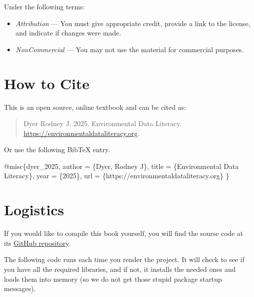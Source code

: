 \documentclass[
  letterpaper,
]{book}
\newenvironment{Shaded}{\begin{snugshade}}{\end{snugshade}}
\newcommand{\DataTypeTok}[1]{\textcolor[rgb]{0.68,0.00,0.00}{#1}}
\newcommand{\NormalTok}[1]{\textcolor[rgb]{0.00,0.23,0.31}{#1}}
\newcommand{\OtherTok}[1]{\textcolor[rgb]{0.00,0.23,0.31}{#1}}
\newcommand{\VariableTok}[1]{\textcolor[rgb]{0.07,0.07,0.07}{#1}}
\providecommand{\tightlist}{%
  \setlength{\itemsep}{0pt}\setlength{\parskip}{0pt}}
\begin{document}
Under the following terms:

\begin{itemize}
\tightlist
\item
  \emph{Attribution} --- You must give appropriate credit, provide a
  link to the license, and indicate if changes were made.\\
\item
  \emph{NonCommercial} --- You may not use the material for commercial
  purposes.
\end{itemize}

\section{How to Cite}\label{how-to-cite}

This is an open source, online textbook and can be cited as:

\begin{quote}
Dyer Rodney J. 2025. Environmental Data Literacy.
\url{https://environmentaldataliteracy.org}.
\end{quote}

Or use the following BibTeX entry.

\begin{Shaded}
\begin{Highlighting}[]
\VariableTok{@misc}\NormalTok{\{}\OtherTok{dyer\_2025}\NormalTok{,}
  \DataTypeTok{author}\NormalTok{ = \{Dyer, Rodney J\},}
  \DataTypeTok{title}\NormalTok{ = \{Environmental Data Literacy\},}
  \DataTypeTok{year}\NormalTok{ = \{2025\},}
  \DataTypeTok{url}\NormalTok{ = \{https://environmentaldataliteracy.org\}}
\NormalTok{\}}
\end{Highlighting}
\end{Shaded}

\section{Logistics}\label{logistics}

If you would like to compile this book yourself, you will find the
sourse code at its
\href{https://github.com/DyerlabTeaching/ENVS543-Book}{GitHub
repository}.

The following code runs each time you render the project. It will check
to see if you have all the required libraries, and if not, it installs
the needed ones and loads them into memory (so we do not get those
stupid package startup messages).
\end{document}
